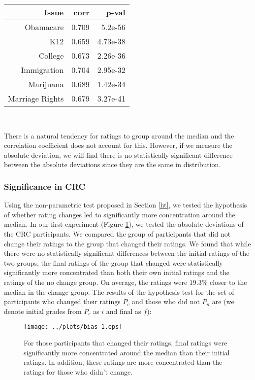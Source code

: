 {\centering
\scriptsize
\begin{tabular}[!ht] { r | r | r }
\label{ref-2}
  Issue & corr & p-val \\
  \hline
  \hline
  Obamacare &  0.709 & 5.2e-56 \\
  \hline
  K12 & 0.659 & 4.73e-38 \\
  \hline
  College & 0.673 & 2.26e-36 \\
  \hline
  Immigration & 0.704 & 2.95e-32\\
  \hline
  Marijuana & 0.689 & 1.42e-34\\
  \hline
  Marriage Rights & 0.679 & 3.27e-41 \\
\end{tabular}\\[1\baselineskip]
}
There is a natural tendency for ratings to group around the median and the correlation coefficient does not account for this.
However, if we measure the absolute deviation, we will find there is no statistically significant difference between the absolute deviations since they are the same in distribution.

\subsubsection{Significance in CRC}
Using the non-parametric test proposed in Section \ref{ht}, we tested the hypothesis of whether rating changes led to significantly more concentration around the median.
In our first experiment (Figure \ref{mdev-1}), we tested the absolute deviations of the CRC participants.
We compared the group of participants that did not change their ratings to the group that changed their ratings.
We found that while there were no statistically significant differences between the initial ratings of the two groups, the final ratings of the group that changed were statistically significantly more concentrated than both their own initial ratings and the ratings of the no change group.
On average, the ratings were $19.3\%$ closer to the median in the change group.
The results of the hypothesis test for the set of participants who changed their ratings $P_c$ and those who did not $P_n$ are (we denote initial grades from $P_c$ as $i$ and final as $f$):
\begin{figure}[h]
\centering
    \texttt{[image: ../plots/bias-1.eps]}
      \caption{For those participants that changed their ratings, final ratings were significantly more concentrated around the median than their initial ratings. In addition, these ratings are more concentrated than the ratings for those who didn't change.}
      \label{mdev-1}
\end{figure}

